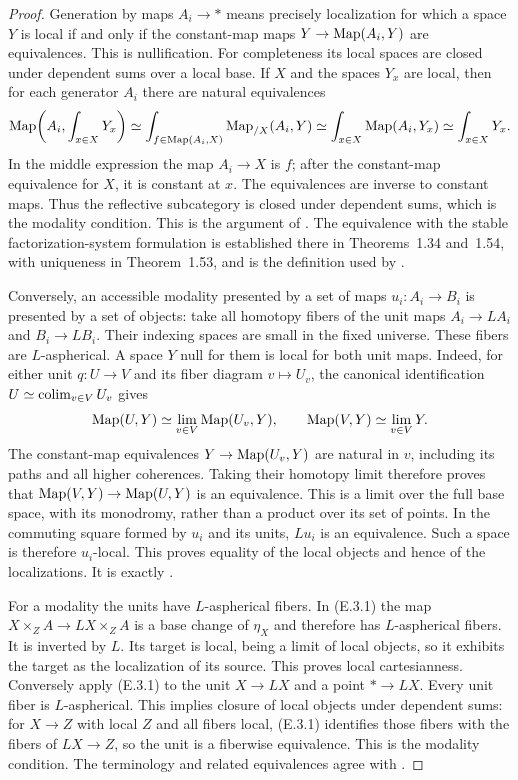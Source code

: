 \begin{proof}
Generation by maps $A_i\to*$ means precisely localization for
which a space $Y$ is local if and only if the constant-map maps
$Y\to\operatorname{Map}(A_i,Y)$ are equivalences. This is nullification.
For completeness its local spaces are closed under dependent
sums over a local base. If $X$ and the spaces $Y_x$ are local,
then for each generator $A_i$ there are natural equivalences
\[
 \operatorname{Map}\!\left(A_i,\int_{x\in X}Y_x\right)
 \simeq\int_{f\in\operatorname{Map}(A_i,X)}\operatorname{Map}_{/X}(A_i,Y)
 \simeq\int_{x\in X}\operatorname{Map}(A_i,Y_x)
 \simeq\int_{x\in X}Y_x.
\]
In the middle expression the map $A_i\to X$ is $f$; after the
constant-map equivalence for $X$, it is constant at $x$. The
equivalences are inverse to constant maps. Thus the reflective
subcategory is closed under dependent sums, which is the
modality condition. This is the argument of
\citet[Theorem 2.19]{CERijkeShulmanSpitters2020}.
The equivalence with the stable factorization-system formulation
is established there in Theorems~1.34 and~1.54, with uniqueness
in Theorem~1.53, and is the definition used
by \citet[Section 3.4]{CEAnelEtAl2020}.

Conversely, an accessible modality presented by a set of maps
$u_i:A_i\to B_i$ is presented by a set of objects: take all
homotopy fibers of the unit maps $A_i\to LA_i$ and
$B_i\to LB_i$. Their indexing spaces are small in the fixed
universe. These fibers are $L$-aspherical. A space $Y$ null for
them is local for both unit maps. Indeed, for either unit
$q:U\to V$ and its fiber diagram $v\mapsto U_v$, the
canonical identification $U\simeq\operatorname{colim}_{v\in V}U_v$ gives
\[
 \operatorname{Map}(U,Y)\simeq\lim_{v\in V}\operatorname{Map}(U_v,Y),\qquad
 \operatorname{Map}(V,Y)\simeq\lim_{v\in V}Y.
\]
The constant-map equivalences $Y\to\operatorname{Map}(U_v,Y)$ are natural
in $v$, including its paths and all higher coherences.
Taking their homotopy limit therefore proves that
$\operatorname{Map}(V,Y)\to\operatorname{Map}(U,Y)$ is an equivalence. This is a
limit over the full base space, with its monodromy, rather
than a product over its set of points. In the commuting square formed
by $u_i$ and its units, $Lu_i$ is an equivalence. Such a space
is therefore $u_i$-local. This proves equality of the local
objects and hence of the localizations. It is exactly
\citet[Lemma 2.20]{CERijkeShulmanSpitters2020}.

For a modality the units have $L$-aspherical fibers. In (E.3.1)
the map $X\times_ZA\to LX\times_ZA$ is a base change of
$\eta_X$ and therefore has $L$-aspherical fibers. It is
inverted by $L$. Its target is local, being a limit of local
objects, so it exhibits the target as the localization of its
source. This proves local cartesianness. Conversely apply
(E.3.1) to the unit $X\to LX$ and a point $*\to LX$.
Every unit fiber is $L$-aspherical. This implies closure of
local objects under dependent sums: for $X\to Z$ with local
$Z$ and all fibers local, (E.3.1) identifies those fibers with
the fibers of $LX\to Z$, so the unit is a fiberwise
equivalence. This is the modality condition. The terminology
and related equivalences agree with
\citet[Propositions 3.1 and 3.3]{CEMacpherson2021}.


\end{proof}
